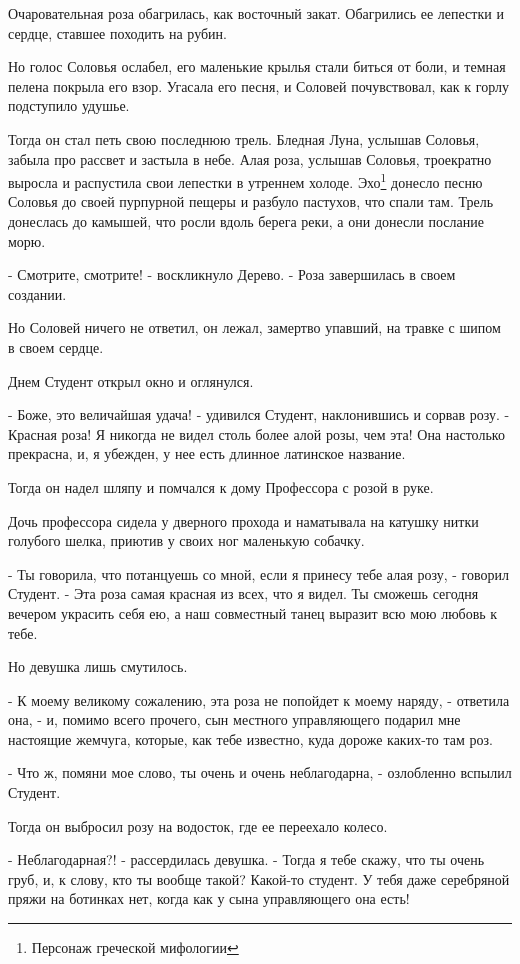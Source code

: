 \documentclass[a4paper]{article}
\theoremstyle{defin}
\theoremstyle{theorem}
\theoremstyle{prop}
\theoremstyle{lemma}
\theoremstyle{ex}
\theoremstyle{col}
\begin{document}
Очаровательная роза обагрилась, как восточный закат. Обагрились ее лепестки и сердце, ставшее походить на рубин.

Но голос Соловья ослабел, его маленькие крылья стали биться от боли, и темная пелена покрыла его взор. Угасала его песня, и Соловей почувствовал, как к горлу подступило удушье.

Тогда он стал петь свою последнюю трель. Бледная Луна, услышав Соловья, забыла про рассвет и застыла в небе. Алая роза, услышав Соловья, троекратно выросла и распустила свои лепестки в утреннем холоде. Эхо\footnote{Персонаж греческой мифологии} донесло песню Соловья до своей пурпурной пещеры и разбуло пастухов, что спали там. Трель донеслась до камышей, что росли вдоль берега реки, а они донесли послание морю.

- Смотрите, смотрите! - воскликнуло Дерево. - Роза завершилась в своем создании.

Но Соловей ничего не ответил, он лежал, замертво упавший, на травке с шипом в своем сердце.

Днем Студент открыл окно и оглянулся.

- Боже, это величайшая удача! - удивился Студент, наклонившись и сорвав розу. - Красная роза! Я никогда не видел столь более алой розы, чем эта! Она настолько прекрасна, и, я убежден, у нее есть длинное латинское название.

Тогда он надел шляпу и помчался к дому Профессора с розой в руке.

Дочь профессора сидела у дверного прохода и наматывала на катушку нитки голубого шелка, приютив у своих ног маленькую собачку.

- Ты говорила, что потанцуешь со мной, если я принесу тебе алая розу, - говорил Студент. - Эта роза самая красная из всех, что я видел. Ты сможешь сегодня вечером украсить себя ею, а наш совместный танец выразит всю мою любовь к тебе.

Но девушка лишь смутилось.

- К моему великому сожалению, эта роза не попойдет к моему наряду, - ответила она, - и, помимо всего прочего, сын местного управляющего подарил мне настоящие жемчуга, которые, как тебе известно, куда дороже каких-то там роз.

- Что ж, помяни мое слово, ты очень и очень неблагодарна, - озлобленно вспылил Студент.

Тогда он выбросил розу на водосток, где ее переехало колесо.

- Неблагодарная?! - рассердилась девушка. - Тогда я тебе скажу, что ты очень груб, и, к слову, кто ты вообще такой? Какой-то студент. У тебя даже серебряной пряжи на ботинках нет, когда как у сына управляющего она есть!
\end{document}
